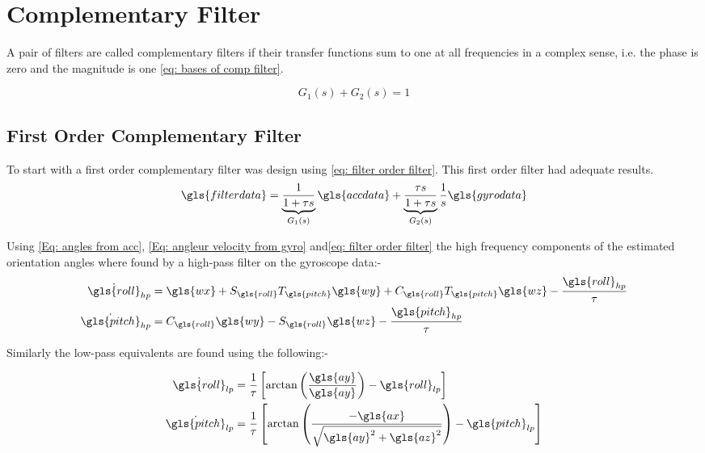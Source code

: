  \tocless\section{ Complementary Filter}
A pair of filters are called complementary filters if their transfer functions sum to one at all frequencies in a complex sense, i.e. the phase is zero and the magnitude is one \ref{eq: bases of comp filter}.


\begin{equation}
G_1(s) + G_2(s) =1 \label{eq: bases of comp filter}
\end{equation}

 \tocless\subsection{First Order Complementary Filter}

To start with a first order complementary filter was design using \eqref{eq: filter order filter}. This first order filter had adequate results.
\begin{equation}
\gls{filterdata} = \underbrace{\frac{1}{1 + \tau s}}_{\text{$G_1(s)$}}\gls{accdata} + \underbrace{\frac{\tau s}{1 + \tau s}}_{\text{$G_2(s)$}}\frac{1}{s}\gls{gyrodata}
\label{eq: filter order filter}
\end{equation}


Using \eqref{Eq: angles from acc}, \eqref{Eq: angleur velocity from gyro} and\eqref{eq: filter order filter} the high frequency components of the estimated orientation angles where found by a high-pass filter on the gyroscope data:-
\begin{align}
	\dot{\gls{roll}}_{hp} &=   \gls{wx} + S_{\gls{roll}}T_{\gls{pitch}}\gls{wy} + C_{\gls{roll}}T_{\gls{pitch}}\gls{wz}   - \frac{\gls{roll}_{hp}}{\tau}\\
	\dot{\gls{pitch}}_{hp} &=  C_{\gls{roll}}\gls{wy} - S_{\gls{roll}}\gls{wz} - \frac{\gls{pitch}_{hp}}{\tau}
\end{align}

Similarly the low-pass equivalents are found using the following:-

\begin{align}
\dot{\gls{roll}}_{lp} &=   \frac{1}{\tau}\left[\arctan\left(\frac{\gls{ay}}{\gls{ay}}\right) - \gls{roll}_{lp}\right]\\
\dot{\gls{pitch}}_{lp} &=  \frac{1}{\tau}\left[\arctan\left(\frac{-\gls{ax}}{\sqrt{\gls{ay}^2+\gls{az}^2}}\right) - \gls{pitch}_{lp}\right]
\end{align}

